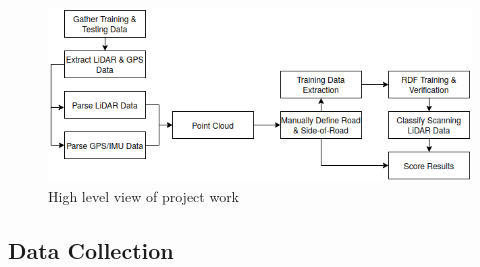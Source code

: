 \documentclass[journal,onecolumn]{IEEEtran}
\begin{document}
			\begin{figure}[H]
				\centering
				\includegraphics[width=0.9\linewidth]{figures/flowz_2}
				\caption[Project Flow]{High level view of project work}
				\label{fig:flowz_2}
			\end{figure}	
	
	
		\subsection{Data Collection}
	
	
\end{document}
